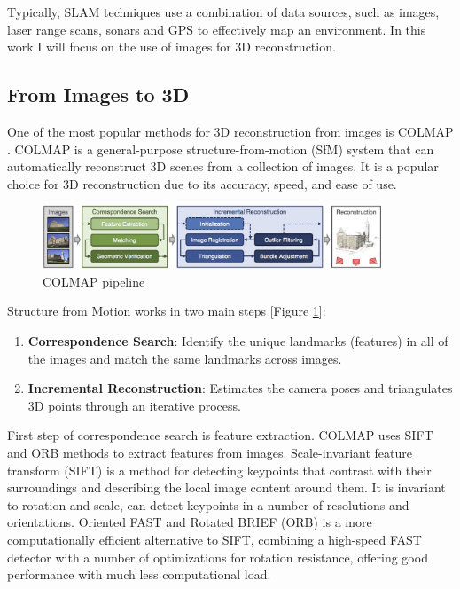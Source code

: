 Typically, SLAM techniques use a combination of data sources, such as images, laser range scans, sonars and GPS to effectively map an environment.
In this work I will focus on the use of images for 3D reconstruction.

\subsection{From Images to 3D}

One of the most popular methods for 3D reconstruction from images is COLMAP \cite{colmap}. COLMAP is a general-purpose structure-from-motion (SfM) \cite{multipleviewgeometry} system that can automatically reconstruct 3D scenes from a collection of images. It is a popular choice for 3D reconstruction due to its accuracy, speed, and ease of use.

\begin{figure}[h]
  \centering
  \includegraphics[width=0.9\textwidth]{images/related-work/COLMAP.png}
  \caption{COLMAP pipeline}
  \label{fig:colmap-pipeline}
\end{figure}

Structure from Motion works in two main steps [Figure \ref{fig:colmap-pipeline}]:
\begin{enumerate}
  \item \textbf{Correspondence Search}: Identify the unique landmarks (features) in all of the images and match the same landmarks across images.
  \item \textbf{Incremental Reconstruction}: Estimates the camera poses and triangulates 3D points through an iterative process.
\end{enumerate}

First step of correspondence search is feature extraction. COLMAP uses SIFT \cite{sift} and ORB \cite{orb} methods to extract features from images. Scale-invariant feature transform (SIFT) is a method for detecting keypoints that contrast with their surroundings and describing the local image content around them. It is invariant to rotation and scale, can detect keypoints in a number of resolutions and orientations. Oriented FAST and Rotated BRIEF (ORB) is a more computationally efficient alternative to SIFT, combining a high-speed FAST detector with a number of optimizations for rotation resistance, offering good performance with much less computational load.

